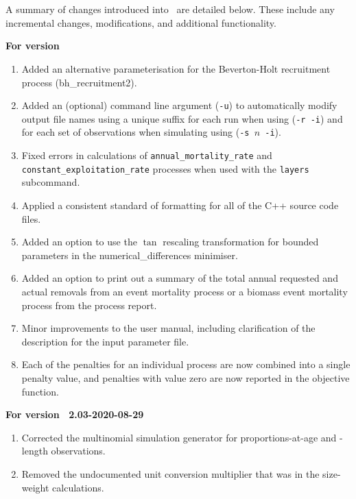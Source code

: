 \section{}

A summary of changes introduced into \SPM\ are detailed below. These include any incremental changes, modifications, and additional functionality.

\textbf{For version \SPM\ \VER}
\begin{enumerate}
  \item Added an alternative parameterisation for the Beverton-Holt recruitment process (bh\_recruitment2).
  \item Added an (optional) command line argument (\texttt{-u}) to automatically modify output file names using a unique suffix for each run when using (\texttt{-r -i}) and for each set of observations when simulating using (\texttt{-s \emph{$n$}\ -i}).
	\item Fixed errors in calculations of \texttt{annual\_mortality\_rate} and \texttt{constant\_exploitation\_rate} processes when used with the \texttt{layers} subcommand.
	\item Applied a consistent standard of formatting for all of the C++ source code files.
	\item Added an option to use the $\tan$ rescaling transformation for bounded parameters in the numerical\_differences minimiser.
	\item Added an option to print out a summary of the total annual requested and actual removals from an event mortality process or a biomass event mortality process from the process report.
	\item Minor improvements to the user manual, including clarification of the description for the input parameter file.
	\item Each of the penalties for an individual process are now combined into a single penalty value, and penalties with value zero are now reported in the objective function.
\end{enumerate}

\textbf{For version \SPM\ 2.03-2020-08-29}
\begin{enumerate}
  \item Corrected the multinomial simulation generator for proportions-at-age and -length observations.
	\item Removed the undocumented unit conversion multiplier that was in the size-weight calculations.
\end{enumerate}

